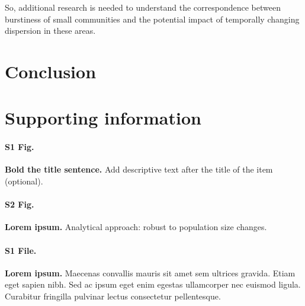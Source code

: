 \documentclass[10pt,letterpaper]{article}
\begin{document}
So, additional research is needed to understand the correspondence between burstiness of small communities and the potential impact of temporally changing dispersion in these areas.

\section*{Conclusion}

\section*{Supporting information}

\paragraph*{S1 Fig.}
\label{S1_Fig}
{\bf Bold the title sentence.} Add descriptive text after the title of the item (optional).

\paragraph*{S2 Fig.}
\label{S2_Fig}
{\bf Lorem ipsum.} Analytical approach: robust to population size changes.

\paragraph*{S1 File.}
\label{S1_File}
{\bf Lorem ipsum.}  Maecenas convallis mauris sit amet sem ultrices gravida. Etiam eget sapien nibh. Sed ac ipsum eget enim egestas ullamcorper nec euismod ligula. Curabitur fringilla pulvinar lectus consectetur pellentesque.
\end{document}
